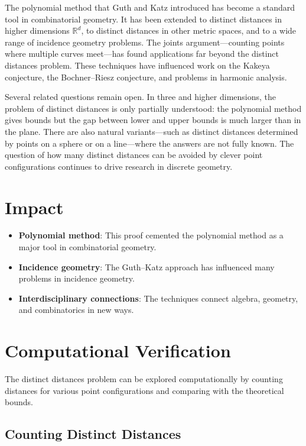 The polynomial method that Guth and Katz introduced has become a standard tool in combinatorial geometry. It has been extended to distinct distances in higher dimensions $\mathbb{R}^d$, to distinct distances in other metric spaces, and to a wide range of incidence geometry problems. The joints argument---counting points where multiple curves meet---has found applications far beyond the distinct distances problem. These techniques have influenced work on the Kakeya conjecture, the Bochner--Riesz conjecture, and problems in harmonic analysis.

Several related questions remain open. In three and higher dimensions, the problem of distinct distances is only partially understood: the polynomial method gives bounds but the gap between lower and upper bounds is much larger than in the plane. There are also natural variants---such as distinct distances determined by points on a sphere or on a line---where the answers are not fully known. The question of how many distinct distances can be avoided by clever point configurations continues to drive research in discrete geometry.

\section{Impact}

\begin{itemize}
\item \textbf{Polynomial method}: This proof cemented the polynomial method as a major tool in combinatorial geometry.
\item \textbf{Incidence geometry}: The Guth--Katz approach has influenced many problems in incidence geometry.
\item \textbf{Interdisciplinary connections}: The techniques connect algebra, geometry, and combinatorics in new ways.
\end{itemize}

\section{Computational Verification}

The distinct distances problem can be explored computationally by counting distances for various point configurations and comparing with the theoretical bounds.

\subsection{Counting Distinct Distances}

